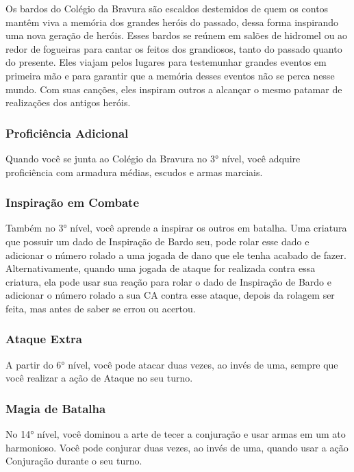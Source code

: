 \documentclass{RPG_Adventure}[2021/10/20]
\begin{document}
Os bardos do Colégio da Bravura são escaldos destemidos de quem os contos mantêm
viva a memória dos grandes heróis do passado, dessa forma inspirando uma nova
geração de heróis. Esses bardos se reúnem em salões de hidromel ou ao redor de
fogueiras para cantar os feitos dos grandiosos, tanto do passado quanto do
presente. Eles viajam pelos lugares para testemunhar grandes eventos em primeira
mão e para garantir que a memória desses eventos não se perca nesse mundo. Com
suas canções, eles inspiram outros a alcançar o mesmo patamar de realizações dos
antigos heróis.

\subsubsection{Proficiência Adicional}%

Quando você se junta ao Colégio da Bravura no 3° nível, você adquire
proficiência com armadura médias, escudos e armas marciais.

\subsubsection{Inspiração em Combate}%

Também no 3° nível, você aprende a inspirar os outros em batalha. Uma criatura
que possuir um dado de Inspiração de Bardo seu, pode rolar esse dado e adicionar
o número rolado a uma jogada de dano que ele tenha acabado de fazer.
Alternativamente, quando uma jogada de ataque for realizada contra essa
criatura, ela pode usar sua reação para rolar o dado de Inspiração de Bardo e
adicionar o número rolado a sua CA contra esse ataque, depois da rolagem ser
feita, mas antes de saber se errou ou acertou.

\subsubsection{Ataque Extra}%

A partir do 6° nível, você pode atacar duas vezes, ao invés de uma, sempre que
você realizar a ação de Ataque no seu turno.

\subsubsection{Magia de Batalha}%

No 14° nível, você dominou a arte de tecer a conjuração e usar armas em um ato
harmonioso. Você pode conjurar duas vezes, ao invés de uma, quando usar a ação
Conjuração durante o seu turno.
\end{document}
